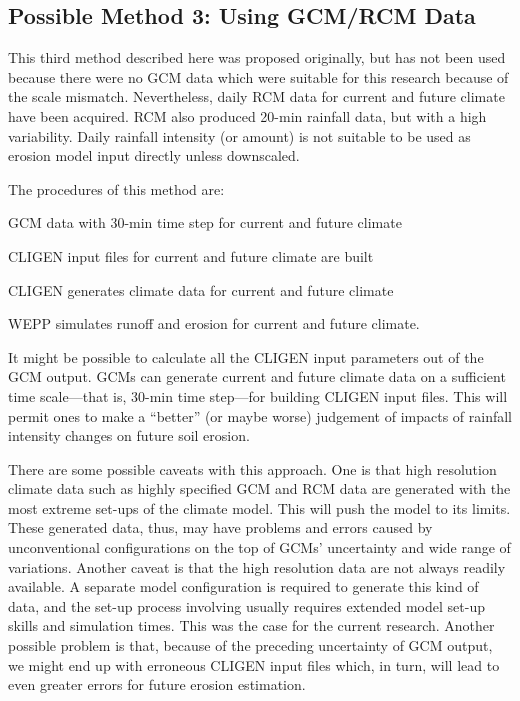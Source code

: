 \subsection{Possible Method 3: Using GCM/RCM Data}
\label{sec:MethodThree}

This third method described here was proposed originally, but has not been used
because there were no GCM data which were suitable for this research because of
the scale mismatch.
Nevertheless, daily RCM data for current and future climate have been acquired.
RCM also produced 20-min rainfall data, but with a high variability. Daily
rainfall intensity (or amount) is not suitable to be used as erosion model input
directly unless downscaled.

The procedures of this method are:
\begin{enumerate*}
  \item GCM data with 30-min time step for current and future climate
  \item CLIGEN input files for current and future climate are built
  \item CLIGEN generates climate data for current and future climate
  \item WEPP simulates runoff and erosion for current and future climate.
\end{enumerate*}

It might be possible to calculate all the CLIGEN input parameters out of the GCM
output. GCMs can generate current and future climate data on a sufficient time
scale---that is, 30-min time step---for building CLIGEN input files. This will
permit ones to make a ``better'' (or maybe worse) judgement of impacts of
rainfall intensity changes on future soil erosion.

There are some possible caveats with this approach. One is that high resolution
climate data such as highly specified GCM and RCM data are generated with the
most extreme set-ups of the climate model. This will push the model to its
limits. These generated data, thus, may have problems and errors caused by
unconventional configurations on the top of GCMs' uncertainty and wide range of
variations. Another caveat is that the high resolution data are not always
readily available. A separate model configuration is required to generate this
kind of data, and the set-up process involving usually requires extended model
set-up skills and simulation times. This was the case for the current research.
Another possible problem is that, because of the preceding uncertainty of GCM
output, we might end up with erroneous CLIGEN input files which, in turn, will
lead to even greater errors for future erosion estimation.

